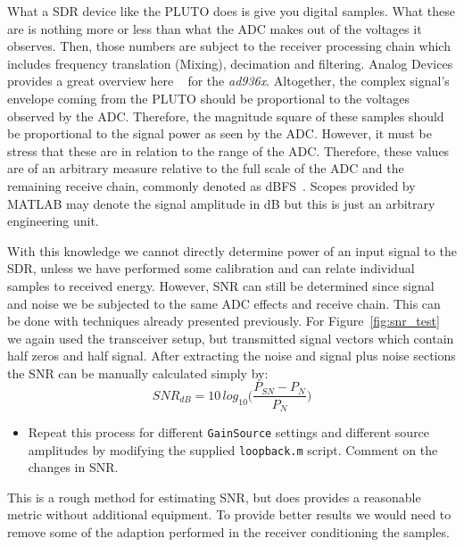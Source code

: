 \documentclass[letterpaper,12pt]{article}
\begin{document}
What a SDR device like the PLUTO does is give you digital samples. What these are is nothing more or less than what the ADC makes out of the voltages it observes. Then, those numbers are subject to the receiver processing chain which includes frequency translation (Mixing), decimation and filtering.  Analog Devices provides a great overview here ~\cite{ad936x} for the \textit{ad936x}.  Altogether, the complex signal's envelope coming from the PLUTO should be proportional to the voltages observed by the ADC. Therefore, the magnitude square of these samples should be proportional to the signal power as seen by the ADC. However, it must be stress that these are in relation to the range of the ADC. Therefore, these values are of an arbitrary measure relative to the full scale of the ADC and the remaining receive chain, commonly denoted as dBFS~\cite{sigpow}. Scopes provided by MATLAB may denote the signal amplitude in dB but this is just an arbitrary engineering unit.\par
%
With this knowledge we cannot directly determine power of an input signal to the SDR, unless we have performed some calibration and can relate individual samples to received energy. However, SNR can still be determined since signal and noise we be subjected to the same ADC effects and receive chain.  This can be done with techniques already presented previously. For Figure~\ref{fig:snr_test} we again used the transceiver setup, but transmitted signal vectors which contain half zeros and half signal.  After extracting the noise and signal plus noise sections the SNR can be manually calculated simply by:
%
\begin{equation}
    SNR_{dB} = 10\,log_{10}\Big(\frac{P_{SN}-P_{N}}{P_{N}}\Big)
\end{equation}
%
\begin{itemize}
 \item Repeat this process for different \texttt{GainSource} settings and different source amplitudes by modifying the supplied \texttt{loopback.m} script.  Comment on the changes in SNR.
 \end{itemize}
This is a rough method for estimating SNR, but does provides a reasonable metric without additional equipment. To provide better results we would need to remove some of the adaption performed in the receiver conditioning the samples.
%
\end{document}

